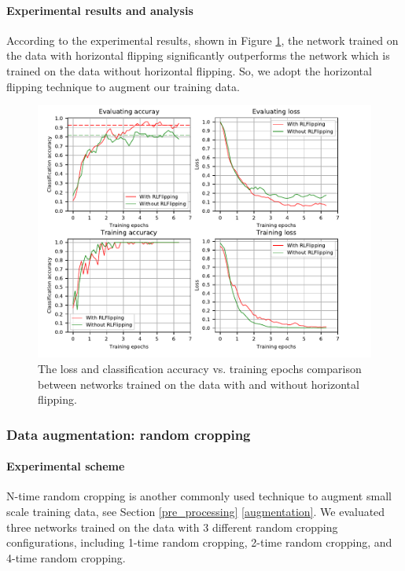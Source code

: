 \paragraph{Experimental results and analysis}
According to the experimental results, shown in Figure \ref{fig:plot_rlf}, the network trained on the data with horizontal flipping significantly outperforms the network which is trained on the data without horizontal flipping. So, we adopt the horizontal flipping technique to augment our training data. 
\begin{figure}
	\includegraphics[trim=0cm 0cm 0cm 0cm]{fig01/plot_rlf.pdf}
	\caption{The loss and classification accuracy vs. training epochs comparison between networks trained on the data with and without horizontal flipping.}
	\label{fig:plot_rlf}
\end{figure}


\subsubsection{Data augmentation: random cropping}
\paragraph{Experimental scheme}
N-time random cropping is another commonly used technique to augment small scale training data, see Section \ref{pre_processing} \ref{augmentation}. We evaluated three networks trained on the data with 3 different random cropping configurations, including 1-time random cropping, 2-time random cropping, and 4-time random cropping. 

